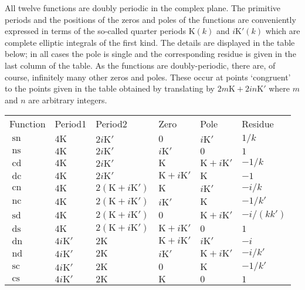All twelve functions are doubly periodic in the complex plane.
The primitive periods and the positions of the zeros and poles of the
functions are conveniently expressed in terms of the so-called quarter periods
$\mathrm{K}(k)$ and $i\mathrm{K}'(k)$ which are complete elliptic
integrals of the first kind. The details are displayed in the table below;
in all cases the pole is single and the corresponding residue is given in
the last column of the table.
As the functions are doubly-periodic, there are, of course, infinitely many
other zeros and poles. These occur at points `congruent' to the points
given in the table obtained by translating by
$2m\mathrm{K} +2i n\mathrm{K}'$ where $m$ and $n$ are arbitrary integers.

\begin{tabular}{llllll}
  Function & Period1 & Period2 & Zero & Pole & Residue\\
$\mathop{\mathrm{sn}}$&$4\mathrm{K}$&$2i\mathrm{K}'$&$0$&$i\mathrm{K}'$&$1/k$\\
$\mathop{\mathrm{ns}}$&$4\mathrm{K}$&$2i\mathrm{K}'$&$i\mathrm{K}'$&$0$&$1$\\
$\mathop{\mathrm{cd}}$&$4\mathrm{K}$&$2i\mathrm{K}'$&$\mathrm{K}$&$\mathrm{K}+i\mathrm{K}'$&$-1/k$\\  
$\mathop{\mathrm{dc}}$&$4\mathrm{K}$&$2i\mathrm{K}'$&$\mathrm{K}+i\mathrm{K}'$&$\mathrm{K}$&$-1$\\ 

$\mathop{\mathrm{cn}}$&$4\mathrm{K}$&$2(\mathrm{K}+i\mathrm{K}')$&$\mathrm{K}$&$i\mathrm{K}'$&$-i/k$\\
$\mathop{\mathrm{nc}}$&$4\mathrm{K}$&$2(\mathrm{K}+i\mathrm{K}')$&$i\mathrm{K}'$&$\mathrm{K}$&$-1/k'$\\
$\mathop{\mathrm{sd}}$&$4\mathrm{K}$&$2(\mathrm{K}+i\mathrm{K}')$&$0$&$\mathrm{K}+i\mathrm{K}'$&$-i/(k k')$\\
$\mathop{\mathrm{ds}}$&$4\mathrm{K}$&$2(\mathrm{K}+i\mathrm{K}')$&$\mathrm{K}+i\mathrm{K}'$&$0$&$1$\\

$\mathop{\mathrm{dn}}$&$4i\mathrm{K}'$&$2\mathrm{K}$&$\mathrm{K}+i\mathrm{K}'$&$i\mathrm{K}'$&$-i$\\
$\mathop{\mathrm{nd}}$&$4i\mathrm{K}'$&$2\mathrm{K}$&$i\mathrm{K}'$&$\mathrm{K}+i\mathrm{K}'$&$-i/k'$\\
$\mathop{\mathrm{sc}}$&$4i\mathrm{K}'$&$2\mathrm{K}$&$0$&$\mathrm{K}$&$-1/k'$\\
$\mathop{\mathrm{cs}}$&$4i\mathrm{K}'$&$2\mathrm{K}$&$\mathrm{K}$&$0$&$1$\\
\end{tabular}

